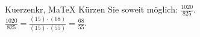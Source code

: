 \begin{MAufgabe}{Kuerzen}{kr, MaTeX}
K\"urzen Sie soweit m\"oglich: $\frac{1020}{825}$.\\ 
\ifLsg\MLoesung
\quad $\frac{1020}{825}=\frac{(15)\cdot(68)}{(15)\cdot(55)}=\frac{68}{55}$.\else\relax\fi
 \end{MAufgabe}